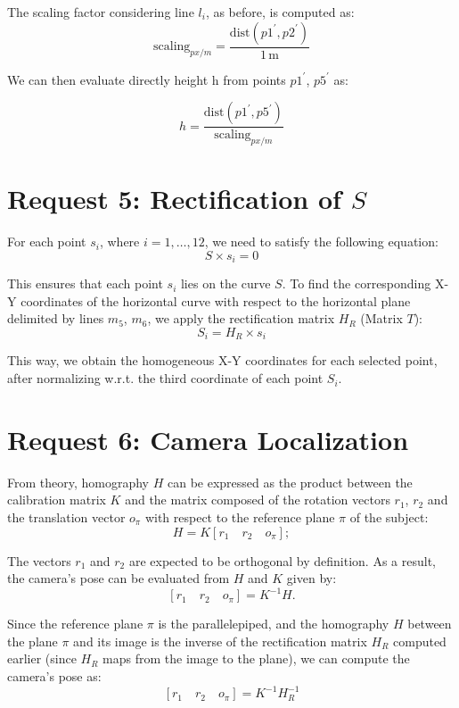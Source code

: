 \documentclass{Configuration_Files/PoliMi3i_thesis}
\begin{document}
The scaling factor considering line \(l_{i}\), as before, is computed as:
\[
\text{scaling}_{px/m} = \frac{\text{dist}(p1^{\prime}, p2^{\prime})}{1\,\text{m}}  
\]

We can then evaluate directly height h from points \(p1^{\prime}\), \(p5^{\prime}\) as:

\[
h = \frac{\text{dist}(p1^{\prime}, p5^{\prime})}{\text{scaling}_{px/m}}  
\]

\newpage
\section{Request 5: Rectification of \(S\)}

\noindent
For each point \(s_{i}\), where \(i = 1, \dots, 12\), we need to satisfy the following equation:
\[
S \times s_{i} = 0  
\]

\noindent
This ensures that each point \(s_{i}\) lies on the curve \(S\). To find the corresponding X-Y coordinates of the horizontal curve with respect to the horizontal plane delimited by lines \(m_{5}\), \(m_{6}\), we apply the rectification matrix \(H_{R}\) (Matrix $T$):
\[
S_{i} = H_{R} \times s_{i}  
\]

\noindent
This way, we obtain the homogeneous X-Y coordinates for each selected point, after normalizing w.r.t. the third coordinate of each point \(S_{i}\).

\newpage
\section{Request 6: Camera Localization}

\noindent
From theory, homography \(H\) can be expressed as the product between the calibration matrix \(K\) and the matrix composed of the rotation vectors \(r_{1}\), \(r_{2}\) and the translation vector \(o_{\pi}\) with respect to the reference plane \(\pi\) of the subject:
\[
H = K \left[ r_{1} \quad r_{2} \quad o_{\pi} \right];
\]

\noindent
The vectors \(r_{1}\) and \(r_{2}\) are expected to be orthogonal by definition.
As a result, the camera's pose can be evaluated from \(H\) and \(K\) given by:
\[
\left[ r_{1} \quad r_{2} \quad o_{\pi} \right] = K^{-1} H.
\]

\noindent
Since the reference plane \(\pi\) is the parallelepiped, and the homography \(H\) between the plane \(\pi\) and its image is the inverse of the rectification matrix \(H_{R}\) computed earlier (since \(H_{R}\) maps from the image to the plane), we can compute the camera's pose as:
\[
\left[ r_{1} \quad r_{2} \quad o_{\pi} \right] = K^{-1} H_{R}^{-1}  
\]
\end{document}
